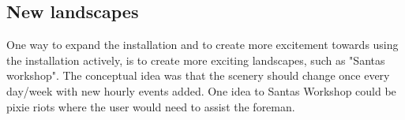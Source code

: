\subsection{New landscapes}
One way to expand the installation and to create more excitement towards using the installation actively, is to create more exciting landscapes, such as "Santas workshop". The conceptual idea was that the scenery should change once every day/week with new hourly events added. One idea to Santas Workshop could be pixie riots where the user would need to assist the foreman.